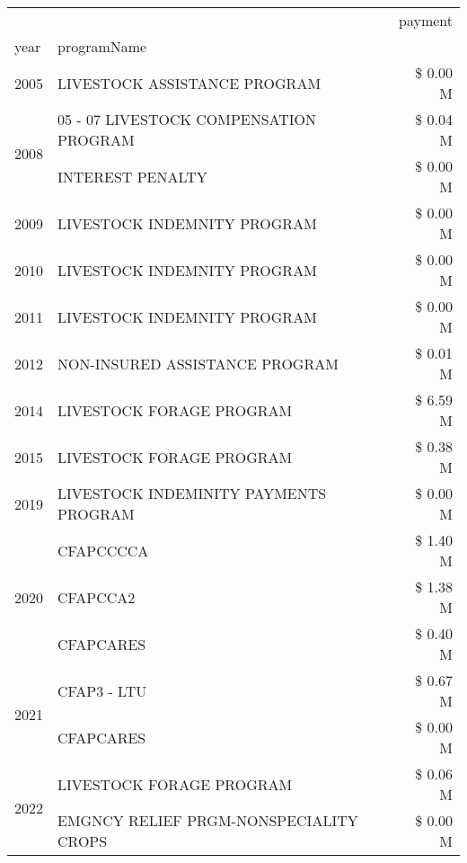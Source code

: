 \begin{tabular}{llr}
\toprule
 &  & payment \\
year & programName &  \\
\midrule
2005 & LIVESTOCK ASSISTANCE PROGRAM & \$ 0.00 M \\
\cline{1-3}
\multirow[t]{2}{*}{2008} & 05 - 07 LIVESTOCK COMPENSATION PROGRAM & \$ 0.04 M \\
 & INTEREST PENALTY & \$ 0.00 M \\
\cline{1-3}
2009 & LIVESTOCK INDEMNITY PROGRAM & \$ 0.00 M \\
\cline{1-3}
2010 & LIVESTOCK INDEMNITY PROGRAM & \$ 0.00 M \\
\cline{1-3}
2011 & LIVESTOCK INDEMNITY PROGRAM & \$ 0.00 M \\
\cline{1-3}
2012 & NON-INSURED ASSISTANCE PROGRAM & \$ 0.01 M \\
\cline{1-3}
2014 & LIVESTOCK FORAGE PROGRAM & \$ 6.59 M \\
\cline{1-3}
2015 & LIVESTOCK FORAGE PROGRAM & \$ 0.38 M \\
\cline{1-3}
2019 & LIVESTOCK INDEMINITY PAYMENTS PROGRAM & \$ 0.00 M \\
\cline{1-3}
\multirow[t]{3}{*}{2020} & CFAPCCCCA & \$ 1.40 M \\
 & CFAPCCA2 & \$ 1.38 M \\
 & CFAPCARES & \$ 0.40 M \\
\cline{1-3}
\multirow[t]{2}{*}{2021} & CFAP3 - LTU & \$ 0.67 M \\
 & CFAPCARES & \$ 0.00 M \\
\cline{1-3}
\multirow[t]{2}{*}{2022} & LIVESTOCK FORAGE PROGRAM & \$ 0.06 M \\
 & EMGNCY RELIEF PRGM-NONSPECIALITY CROPS & \$ 0.00 M \\
\cline{1-3}
\bottomrule
\end{tabular}
